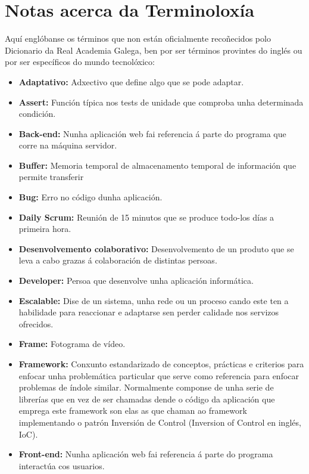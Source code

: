 \section{Notas acerca da Terminoloxía}

    Aquí englóbanse os términos que non están oficialmente recoñecidos polo Dicionario da Real 
    Academia Galega, ben por ser términos provintes do inglés ou por ser específicos do mundo tecnolóxico:
\begin{itemize}
    \item \textbf{Adaptativo:} Adxectivo que define algo que se pode adaptar.
    \item \textbf{Assert:} Función típica nos tests de unidade que comproba unha determinada condición. 
    \item \textbf{Back-end:} Nunha aplicación web fai referencia á parte do programa que corre na máquina 
    servidor.
    \item \textbf{Buffer:} Memoria temporal de almacenamento temporal de información que permite transferir
    \item \textbf{Bug:} Erro no código dunha aplicación.
    \item \textbf{Daily Scrum:} Reunión de 15 minutos que se produce todo-los días a primeira hora.
    \item \textbf{Desenvolvemento colaborativo:} Desenvolvemento de un produto que se leva a cabo grazas á 
        colaboración de distintas persoas.
    \item \textbf{Developer:} Persoa que desenvolve unha aplicación informática.
    \item \textbf{Escalable:} Dise de un sistema, unha rede ou un proceso cando este ten a habilidade para
        reaccionar e adaptarse sen perder calidade nos servizos ofrecidos.
    \item \textbf{Frame:} Fotograma de vídeo.
    \item \textbf{Framework:} Conxunto estandarizado de conceptos, prácticas e criterios para enfocar unha
        problemática particular que serve como referencia para enfocar problemas de índole similar. 
        Normalmente componse de unha serie de librerías que en vez de ser chamadas dende o código da 
        aplicación que emprega este framework son elas as que chaman ao framework implementando o 
        patrón Inversión de Control (Inversion of Control en inglés, IoC).
    \item \textbf{Front-end:} Nunha aplicación web fai referencia á parte do programa interactúa cos usuarios.

\end{itemize}
